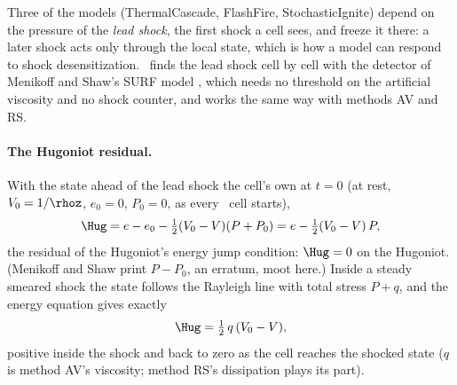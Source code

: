 Three of the models (ThermalCascade, FlashFire, StochasticIgnite) depend on
the pressure of the \emph{lead shock}, the first shock a cell sees, and
freeze it there: a later shock acts only through the local state, which is
how a model can respond to shock desensitization. \bw\ finds the lead shock
cell by cell with the detector of Menikoff and Shaw's SURF model
\cite{menikoff2010}, which needs no threshold on the artificial viscosity and
no shock counter, and works the same way with methods AV and RS.

\paragraph{The Hugoniot residual.} With the state ahead of the lead shock the
cell's own at $t = 0$ (at rest, $V_0 = 1/\rhoz$, $e_0 = 0$, $P_0 = 0$, as
every \bw\ cell starts),
\begin{equation}
  \Hug = e - e_0 - \tfrac{1}{2}(V_0 - V)(P + P_0)
       = e - \tfrac{1}{2}(V_0 - V)\,P,
  \label{eq:hugoniot-residual}
\end{equation}
the residual of the Hugoniot's energy jump condition: $\Hug = 0$ on the
Hugoniot. (Menikoff and Shaw print $P - P_0$, an erratum, moot here.) Inside
a steady smeared shock the state follows the Rayleigh line with total stress
$P + q$, and the energy equation gives exactly
\begin{equation}
  \Hug = \tfrac{1}{2}\,q\,(V_0 - V),
  \label{eq:hugoniot-q}
\end{equation}
positive inside the shock and back to zero as the cell reaches the shocked
state ($q$ is method AV's viscosity; method RS's dissipation plays its
part).

